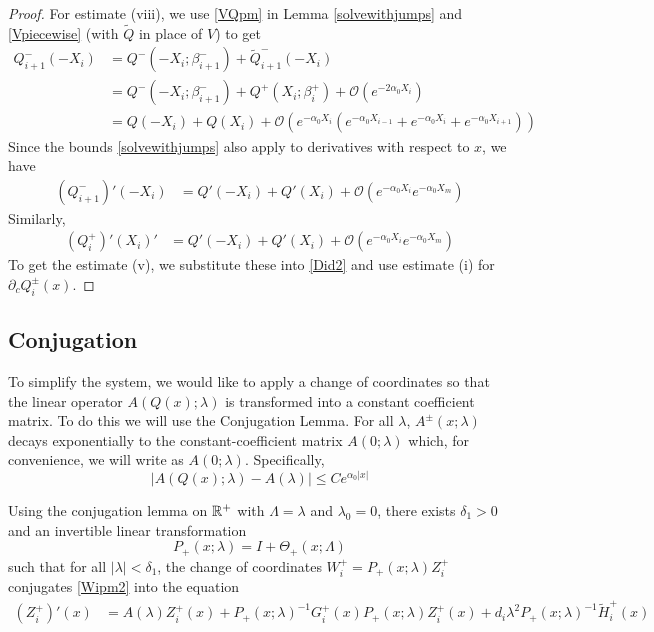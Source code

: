 \documentclass[thesis.tex]{subfiles}
\begin{document}
\begin{lemma}
\begin{proof}
For estimate (viii), we use \eqref{VQpm} in Lemma \ref{solvewithjumps} and \eqref{Vpiecewise} (with $\tilde{Q}$ in place of $V$) to get
\begin{align*}
Q_{i+1}^-(-X_i) &= Q^-(-X_i; \beta_{i+1}^-) + \tilde{Q}_{i+1}^-(-X_i) \\
&= Q^-(-X_i; \beta_{i+1} ^-) + Q^+(X_i; \beta_i^+) + \mathcal{O}(e^{-2 \alpha_0 X_i}) \\
&= Q(-X_i) + Q(X_i) 
+ \mathcal{O}(e^{-\alpha_0 X_i}(e^{-\alpha_0 X_{i-1}}+e^{-\alpha_0 X_i}+e^{-\alpha_0 X_{i+1}}))
\end{align*}
Since the bounds \ref{solvewithjumps} also apply to derivatives with respect to $x$, we have
\begin{align*}
(Q_{i+1}^-)'(-X_i) &= Q'(-X_i) + Q'(X_i) + \mathcal{O}(e^{-\alpha_0 X_i}e^{-\alpha_0 X_m})
\end{align*}
Similarly,
\begin{align*}
(Q_i^+)'(X_i)' &= Q'(-X_i) + Q'(X_i) + \mathcal{O}(e^{-\alpha_0 X_i}e^{-\alpha_0 X_m})
\end{align*}
To get the estimate (v), we substitute these into \eqref{Did2} and use estimate (i) for $\partial_c Q_i^\pm(x)$.
\end{proof}
\end{lemma}

\subsection{Conjugation}

To simplify the system, we would like to apply a change of coordinates so that the linear operator $A(Q(x); \lambda)$ is transformed into a constant coefficient matrix. To do this we will use the Conjugation Lemma. For all $\lambda$, $A^\pm(x; \lambda)$ decays exponentially to the constant-coefficient matrix $A(0; \lambda)$ which, for convenience, we will write as $A(0; \lambda)$. Specifically,
\[
|A(Q(x); \lambda) - A(\lambda)| \leq C e^{\alpha_0 |x|}
\]

Using the conjugation lemma on $\mathbb{R}^+$ with $\Lambda = \lambda$ and $\lambda_0 = 0$, there exists $\delta_1 > 0$ and an invertible linear transformation 
\[
P_+(x; \lambda) = I + \Theta_+(x; \Lambda)
\]
such that for all $|\lambda| < \delta_1$, the change of coordinates $W_i^+ = P_+(x; \lambda) Z_i^+$ conjugates \eqref{Wipm2} into the equation
\begin{align*}\label{Zplus1}
(Z_i^+)'(x) &= A(\lambda) Z_i^+(x) + P_+(x; \lambda)^{-1} G_i^+(x) P_+(x; \lambda) Z_i^+(x) + d_i \lambda^2 P_+(x; \lambda)^{-1} \tilde{H}_i^+
(x)
\end{align*}
\end{document}
